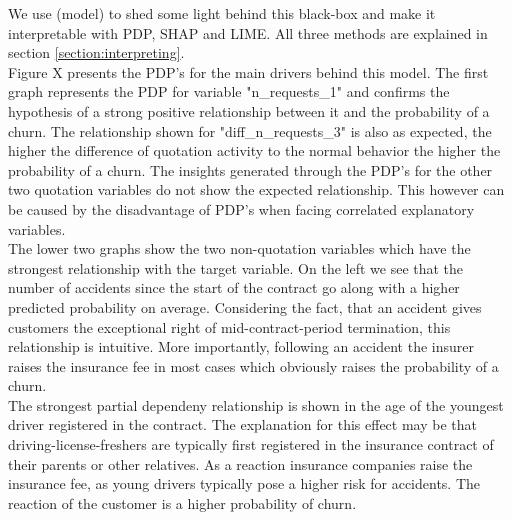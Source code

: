\documentclass[12pt,titlepage]{article}
\begin{document}
We use (model) to shed some light behind this black-box and make it interpretable with PDP, SHAP and LIME. All three methods are explained in section \ref{section:interpreting}. \\
Figure X presents the PDP's for the main drivers behind this model. The first graph represents the PDP for variable "n\_requests\_1" and confirms the hypothesis of a strong positive relationship between it and the probability of a churn. The relationship shown for "diff\_n\_requests\_3" is also as expected, the higher the difference of quotation activity to the normal behavior the higher the probability of a churn. The insights generated through the PDP's for the other two quotation variables do not show the expected relationship. This however can be caused by the disadvantage of PDP's when facing correlated explanatory variables. \\
The lower two graphs show the two non-quotation variables which have the strongest relationship with the target variable. On the left we see that the number of accidents since the start of the contract go along with a higher predicted probability on average. Considering the fact, that an accident gives customers the exceptional right of mid-contract-period termination, this relationship is intuitive. More importantly, following an accident the insurer raises the insurance fee in most cases which obviously raises the probability of a churn. \\
The strongest partial dependeny relationship is shown in the age of the youngest driver registered in the contract. The explanation for this effect may be that driving-license-freshers are typically first registered in the insurance contract of their parents or other relatives. As a reaction insurance companies raise the insurance fee, as young drivers typically pose a higher risk for accidents. The reaction of the customer is a higher probability of churn. \\
\end{document}
